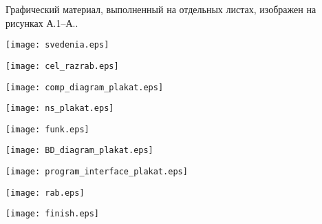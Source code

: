 
Графический материал, выполненный на отдельных листах,
изображен на рисунках А.1--А..
\setcounter{числоПлакатов}{0}

\renewcommand{\thefigure}{А.\arabic{figure}} %

\begin{landscape}

\begin{плакат}
    \texttt{[image: svedenia.eps]}
    \label{svedenia:image}      
\end{плакат}

\begin{плакат}
    \texttt{[image: cel\_razrab.eps]}
    \label{cel_razrab:image}      
\end{плакат}

\begin{плакат}
    \texttt{[image: comp\_diagram\_plakat.eps]}
    \label{comp_diagram_plakat:image}      
\end{плакат}

\begin{плакат}
    \texttt{[image: ns\_plakat.eps]}
    \label{ns_plakat:image}      
\end{плакат}

\begin{плакат}
    \texttt{[image: funk.eps]}
    \label{funk:image}      
\end{плакат}

\begin{плакат}
    \texttt{[image: BD\_diagram\_plakat.eps]}
    \label{BD_diagram_plakat:image}      
\end{плакат}

\begin{плакат}
    \texttt{[image: program\_interface\_plakat.eps]}
    \label{program_interface_plakat:image}      
\end{плакат}

\begin{плакат}
    \texttt{[image: rab.eps]}
    \label{rab:image}      
\end{плакат}

\begin{плакат}
    \texttt{[image: finish.eps]}
    \label{finish:image}      
\end{плакат}

\end{landscape}
